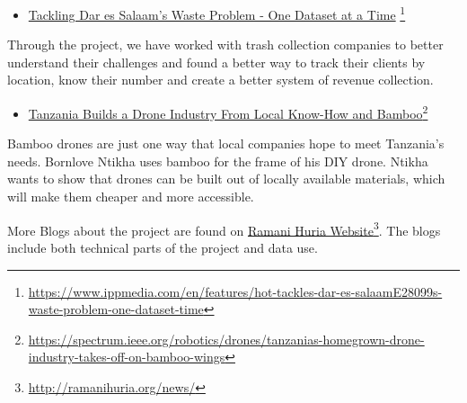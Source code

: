 \documentclass[a4paper,12pt,twoside]{article}
\begin{document}
\begin{itemize}
    \item \href{https://www.ippmedia.com/en/features/hot-tackles-dar-es-salaamE28099s-waste-problem-one-dataset-time}{Tackling Dar es Salaam’s Waste Problem - One Dataset at a Time} \footnote{\url{https://www.ippmedia.com/en/features/hot-tackles-dar-es-salaamE28099s-waste-problem-one-dataset-time}}
\end{itemize}
Through the project, we have worked with trash collection companies to better understand their challenges and found a better way to track their clients by location, know their number and create a better system of revenue collection.

\begin{itemize}
    \item \href{https://spectrum.ieee.org/robotics/drones/tanzanias-homegrown-drone-industry-takes-off-on-bamboo-wings}{ Tanzania Builds a Drone Industry From Local Know-How and Bamboo}\footnote{\url{https://spectrum.ieee.org/robotics/drones/tanzanias-homegrown-drone-industry-takes-off-on-bamboo-wings}}
\end{itemize}
Bamboo drones are just one way that local companies hope to meet Tanzania’s needs. Bornlove Ntikha uses bamboo for the frame of his DIY drone. Ntikha wants to show that drones can be built out of locally available materials, which will make them cheaper and more accessible.

\bigskip

More Blogs about the project are found on \href{http://ramanihuria.org/news/}{Ramani Huria Website}\footnote{\url{http://ramanihuria.org/news/}}. The blogs include both technical parts of the project and data use.

\newpage
\end{document}
